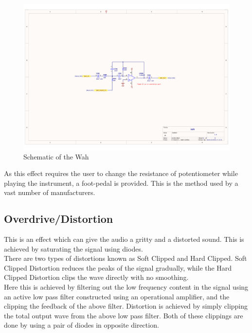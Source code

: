 \documentclass{article}
\begin{document}
                \begin{figure}[h!]
                    \centering
                    \includegraphics[scale=0.4]{Wah.png}
                    \caption{Schematic of the Wah}
                    \label{fig:enter-label}
                \end{figure}
                
                As this effect requires the user to change the resistance of potentiometer while playing the instrument, a foot-pedal is provided. This is the method used by a vast number of manufacturers.

            \subsection{Overdrive/Distortion}
                This is an effect which can give the audio a gritty and a distorted sound. This is achieved by saturating the signal using diodes.\\
                There are two types of distortions known as Soft Clipped and Hard Clipped. Soft Clipped Distortion reduces the peaks of the signal gradually, while the Hard Clipped Distortion clips the wave directly with no smoothing.\\
                Here this is achieved by filtering out the low frequency content in the signal using an active low pass filter constructed using an operational amplifier, and the clipping the feedback of the above filter. Distortion is achieved by simply clipping the total output wave from the above low pass filter. Both of these clippings are done by using a pair of diodes in opposite direction.
\end{document}
